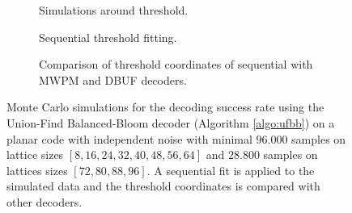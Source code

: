 \begin{figure}[htbp]
  \centering
  \begin{subfigure}[b]{0.49\textwidth}
    \begin{adjustbox}{Clip=0 1em 0 0}
      
    \end{adjustbox}
    \caption{Simulations around threshold.}
  \end{subfigure}
  \begin{subfigure}[b]{0.49\textwidth}
    \begin{adjustbox}{Clip=0 1em 0 0}
      
    \end{adjustbox}
    \caption{Sequential threshold fitting.}
  \end{subfigure}
  \begin{subfigure}[b]{\textwidth}
    \begin{adjustbox}{Clip=0 1em 0 0}
    
    \end{adjustbox}
    \caption{Comparison of threshold coordinates of sequential with MWPM and DBUF decoders.}
  \end{subfigure}
  \caption{Monte Carlo simulations for the decoding success rate using the Union-Find Balanced-Bloom decoder (Algorithm \ref{algo:ufbb}) on a planar code with independent noise with minimal $96.000$ samples on lattice sizes $[8, 16, 24, 32, 40, 48, 56, 64]$ and $28.800$ samples on lattices sizes $[72, 80, 88, 96]$. A sequential fit is applied to the simulated data and the threshold coordinates is compared with other decoders.}
  \label{fig:thres_ufbb_planar_2d}
\end{figure}


